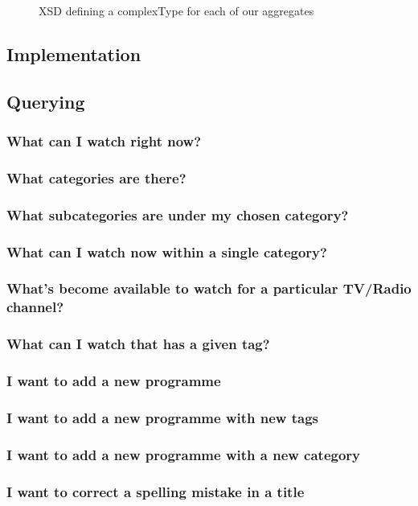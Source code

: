 \documentclass[11pt,a4paper]{article}
\begin{document}
\begin{figure}[p]
  \caption{XSD defining a complexType for each of our aggregates}
  \label{fig:xsd-types}
\end{figure}

\subsection{Implementation}
\subsection{Querying}
\subsubsection{What can I watch right now?}
\subsubsection{What categories are there?}
\subsubsection{What subcategories are under my chosen category?}
\subsubsection{What can I watch now within a single category?}
\subsubsection{What's become available to watch for a particular TV/Radio channel?}
\subsubsection{What can I watch that has a given tag?}
\subsubsection{I want to add a new programme}
\subsubsection{I want to add a new programme with new tags}
\subsubsection{I want to add a new programme with a new category}
\subsubsection{I want to correct a spelling mistake in a title}
\end{document}
